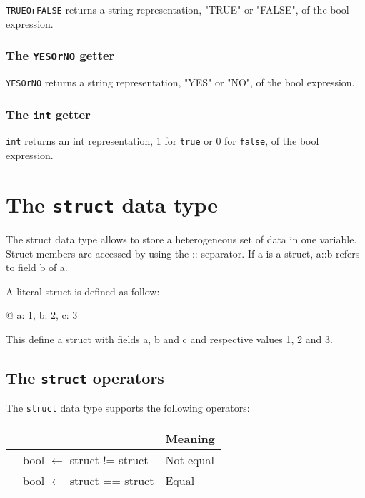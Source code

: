 \documentclass[10pt,openright,twosides,final]{memoir}
\newcommand{\gtltype}[1]{{\small\ttfamily #1}}
\newcommand{\var}[1]{{\small\ttfamily #1}}
\newcommand{\icst}[1]{{\footnotesize\ttfamily\colorbox{light-blue}{#1}}}
\newcommand{\scst}[1]{{\footnotesize\ttfamily\colorbox{light-blue}{"#1"}}}
\newcommand{\gtlinline}[1]{\colorbox{light-blue}{\lstinline[language=gtl]{#1}}}
\begin{document}
\gtlinline{TRUEOrFALSE} returns a string representation, \scst{TRUE} or \scst{FALSE}, of the bool expression.

\subsubsection{The \texttt{YESOrNO} getter}
\label{sec:YESOrNOGetter}

\gtlinline{YESOrNO} returns a string representation, \scst{YES} or \scst{NO}, of the bool expression.

\subsubsection{The \texttt{int} getter}

\gtlinline{int} returns an int representation, \icst{1} for \gtlinline{true} or \icst{0} for \gtlinline{false}, of the bool expression.


\section{The \texttt{struct} data type}

The \gtltype{struct} data type allows to store a heterogeneous set of data in one variable. Struct members are accessed by using the \var{::} separator. If \var{a} is a \gtltype{struct}, \var{a::b} refers to field \var{b} of \var{a}.

A literal struct is defined as follow:

\begin{gtl}
@{ a: 1, b: 2, c: 3 }
\end{gtl}

This define a struct with fields a, b and c and respective values 1, 2 and 3.

\subsection{The \texttt{struct} operators}

The \lstinline{struct} data type supports the following operators:

\begin{longtable}{>{\ttfamily}l|>{\ttfamily}l|p{2.43in}}
{\bfseries Operator}&{\bfseries Expression type}&{\bfseries Meaning}\\
\hline\endhead
 {!=}&
  {bool $\leftarrow$ struct != struct}&
  {Not equal}\\
 {==}&
  {bool $\leftarrow$ struct == struct}&
  {Equal}\\
\end{longtable}
\end{document}
